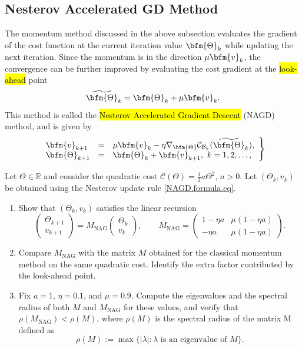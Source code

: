 \subsection{Nesterov Accelerated GD Method}
The momentum method discussed in the above subsection evaluates the gradient of the cost function at the current iteration value $\bfm{\Theta}_k$ while updating the next iteration. Since the momentum is in the direction $\mu \bfm{v}_k$, the convergence can be further improved by evaluating the cost gradient at the \hl{look-ahead} point
$$\widetilde{\bfm{\Theta}}_k = \bfm{\Theta}_k + \mu \bfm{v}_k.$$
This method is called the \hl{Nesterov Accelerated Gradient Descent} (NAGD) method, and is given by
\begin{equation}
\left.\begin{array}{lcl}
\bfm{v}_{k+1} &=& \mu \bfm{v}_k - \eta \nabla_{\bfm{\Theta}}
\mathcal{C}_{\mathcal{B}_k}(\widetilde{\bfm{\Theta}}_k), \\
\bfm{\Theta}_{k+1} &=& \bfm{\Theta}_k + \bfm{v}_{k+1}, ~k=1,2,\ldots,
\end{array}\right\}\label{NAGD.formula.eq}
\end{equation}
\begin{problem}
Let $\Theta \in \mathbb{R}$ and consider the quadratic cost $\mathcal{C}(\Theta) = \frac12 a \Theta^2$, $a>0$. Let $(\Theta_k, v_k)$ be obtained using the Nesterov update rule \eqref{NAGD.formula.eq}.
\begin{enumerate}
\item Show that $(\Theta_k, v_k)$ satisfies the linear recursion
$$
\begin{pmatrix}\Theta_{k+1}\\ v_{k+1}\end{pmatrix}
= M_{\mathrm{NAG}} \begin{pmatrix}\Theta_{k}\\ v_{k}\end{pmatrix}, \qquad
M_{\mathrm{NAG}} = \begin{pmatrix}1-\eta a & \mu(1-\eta a)\\ -\eta a & \mu(1-\eta a)\end{pmatrix}.
$$
\item Compare $M_{\mathrm{NAG}}$ with the matrix $M$ obtained for the classical momentum method on the same quadratic cost. Identify the extra factor contributed by the look-ahead point.
\item Fix $a=1$, $\eta=0.1$, and $\mu=0.9$. Compute the eigenvalues and the spectral radius of both $M$ and $M_{\mathrm{NAG}}$ for these values, and verify that $\rho(M_{\mathrm{NAG}}) < \rho(M)$, where $\rho(M)$ is the spectral radius of the matrix M defined as
$$
\rho(M) := \max\{ |\lambda| : \lambda \text{ is an eigenvalue of } M \}.
$$
\end{enumerate}
\end{problem}

